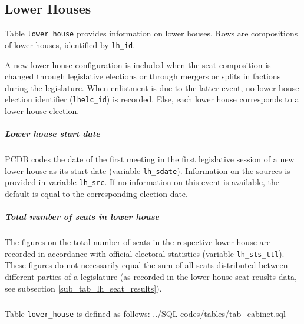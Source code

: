 \subsection{Lower Houses}\label{subsec_tab_lower_house}
Table \texttt{lower\_house} provides information on lower houses.
Rows are compositions of lower houses, identified by \texttt{lh\_id}. 

A new lower house configuration is included when the seat composition is changed through legislative elections or through mergers or splits in factions during the legislature. When enlistment is due to the latter event, no lower house 
election identifier (\texttt{lhelc\_id}) is recorded. Else, each lower house corresponds to a lower house election.

\subparagraph{Lower house start date}
PCDB codes the date of the first meeting in the first legislative session of a new lower house as its start date (variable \texttt{lh\_sdate}). Information on the sources is provided in variable \texttt{lh\_src}. If no information on this event is available, the default is equal to the corresponding election date. 

\subparagraph{Total number of seats in lower house} 
The figures on the total number of seats in the respective lower house are recorded in accordance with official electoral statistics (variable \texttt{lh\_sts\_ttl}). These figures do not necessarily equal the sum of all seats distributed between different parties of a legislature (as recorded in the lower house seat reuslts data,  see subsection \ref{sub_tab_lh_seat_results}).

\subparagraph{}
Table \texttt{lower\_house} is defined as follows:
%
{../SQL-codes/tables/tab_cabinet.sql}
